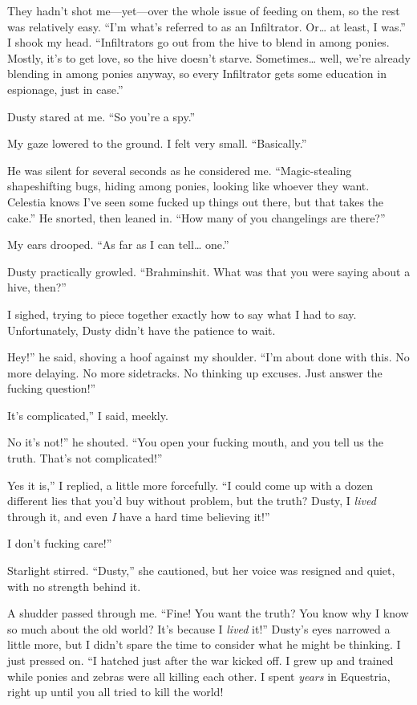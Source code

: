 They hadn’t shot me—yet—over the whole issue of feeding on them, so the rest was relatively easy. “I’m what’s referred to as an Infiltrator. Or… at least, I was.” I shook my head. “Infiltrators go out from the hive to blend in among ponies. Mostly, it’s to get love, so the hive doesn’t starve. Sometimes… well, we’re already blending in among ponies anyway, so every Infiltrator gets some education in espionage, just in case.”

Dusty stared at me. “So you’re a spy.”

My gaze lowered to the ground. I felt very small. “Basically.”

He was silent for several seconds as he considered me. “Magic-stealing shapeshifting bugs, hiding among ponies, looking like whoever they want. Celestia knows I’ve seen some fucked up things out there, but that takes the cake.” He snorted, then leaned in. “How many of you changelings are there?”

My ears drooped. “As far as I can tell… one.”

Dusty practically growled. “Brahminshit. What was that you were saying about a hive, then?”

I sighed, trying to piece together exactly how to say what I had to say. Unfortunately, Dusty didn’t have the patience to wait.

\leavevmode{}Hey!” he said, shoving a hoof against my shoulder. “I’m about done with this. No more delaying. No more sidetracks. No thinking up excuses. Just answer the fucking question!”

\leavevmode{}It’s complicated,” I said, meekly.

\leavevmode{}No it’s not!” he shouted. “You open your fucking mouth, and you tell us the truth. That’s not complicated!”

\leavevmode{}Yes it is,” I replied, a little more forcefully. “I could come up with a dozen different lies that you’d buy without problem, but the truth? Dusty, I \textit{lived} through it, and even \textit{I} have a hard time believing it!”

\leavevmode{}I don’t fucking care!”

Starlight stirred. “Dusty,” she cautioned, but her voice was resigned and quiet, with no strength behind it.

A shudder passed through me. “Fine! You want the truth? You know why I know so much about the old world? It’s because I \textit{lived} it!” Dusty’s eyes narrowed a little more, but I didn’t spare the time to consider what he might be thinking. I just pressed on. “I hatched just after the war kicked off. I grew up and trained while ponies and zebras were all killing each other. I spent \textit{years} in Equestria, right up until you all tried to kill the world!

